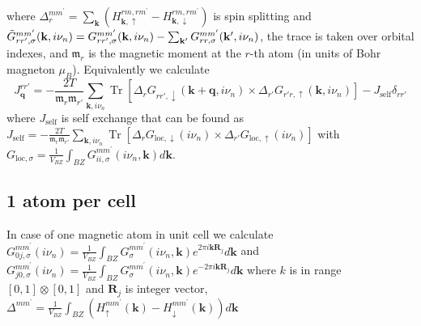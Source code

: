 \documentclass[12pt,a4paper]{article}
\begin{document}
where $\Delta_{r}^{m m^{\prime}} = \sum_{\mathbf k}(H_{\mathbf{k},\uparrow }^{rm, rm^{\prime}}-H_{\mathbf{k},\downarrow}^{rm, rm^{\prime}})$ is spin splitting 
and $\tilde{G}^{mm'}_{ rr',\sigma}({\bf k},i \nu_n)={G}^{mm'}_{ rr',\sigma}({\bf k},i \nu_n)-
\sum_{{\mathbf k}'} G_{rr, \sigma }^{m m^{\prime}}(\mathbf{k}',i \nu_n)$, the trace is taken over orbital indexes, and $\mathfrak{m}_r$ is the magnetic moment at the $r$-th atom (in units of Bohr magneton $\mu_B$). 
Equivalently we calculate 
\begin{equation}
    J^{rr'}_{\mathbf{q}}=  -\frac{2T}{{\mathfrak m}_r{\mathfrak m}_{r'}}  \sum_{{\mathbf k},i \nu_n}\operatorname{Tr}
    \left[\Delta_{ r} G_{ rr',\downarrow}({\mathbf k}+ {\mathbf q},i \nu_n)\right. \times \left.\Delta_{r'} G_{r'r,\uparrow}({\mathbf k},i \nu_n) \right] - J_{\text{self}} \delta_{rr'}
\end{equation}
where $J_{\text{self}}$ is self exchange that can be found as $J_{\text{self}} = -\frac{2T}{{\mathfrak m}_r{\mathfrak m}_{r'}}  \sum_{{\mathbf k},i \nu_n}\operatorname{Tr}
\left[\Delta_{ r} G_{ \text{loc},\downarrow}(i \nu_n)\right. \times \left.\Delta_{r'} G_{\text{loc},\uparrow}(i \nu_n) \right]$ 
with $G_{\text{loc}, \sigma} = \frac{1}{V_{BZ}} \int_{B Z} G_{i i, \sigma }^{m m^{\prime}}(i \nu_n, \mathbf{k})  d \mathbf{k}$.





\subsection{1 atom per cell} %
\label{sub:1}
In case of one magnetic atom in unit cell we calculate 
$    G_{0 j, \sigma}^{m m^{\prime}}(i \nu_n)= \frac{1}{V_{BZ}} \int_{B Z} G_{\sigma}^{m m^{\prime}}(i \nu_n, \mathbf{k}) e^{2 \pi i \mathbf{k} \mathbf{R}_{j}} d \mathbf{k}$ 
and $G_{ j 0, \sigma}^{m m^{\prime}}(i \nu_n)= \frac{1}{V_{BZ}} \int_{B Z} G_{\sigma}^{m m^{\prime}}(i \nu_n, \mathbf{k}) e^{-2 \pi i \mathbf{k} \mathbf{R}_{j}} d \mathbf{k}$
where $k$ is in range $[0, 1] \otimes [0, 1]$ and $\mathbf{R}_j$ is integer vector, $\Delta^{m m^{\prime}} = \frac{1}{V_{BZ}} \int_{B Z}\left(H_{ \uparrow}^{m m^{\prime}}(\mathbf{k})-H_{ \downarrow}^{m m^{\prime}}(\mathbf{k})\right) d \mathbf{k}$
\end{document}
